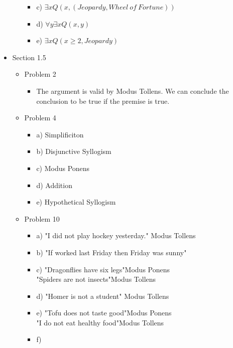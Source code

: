 \documentclass[10pt,a4paper]{article}
\begin{document}
\begin{itemize}
\begin{itemize}
\begin{itemize}
          \item c)
            $\exists xQ(x,(Jeopardy,Wheel\:of\:Fortune))$
          \item d)
            $\forall y\exists xQ(x,y)$
          \item e)
            $\exists xQ(x\ge 2, Jeopardy)$
        \end{itemize}
    \end{itemize}
  \item Section 1.5
    \begin{itemize}
      \item Problem 2
        \begin{itemize}
          \item
          The argument is valid by Modus Tollens. We can conclude the conclusion to be true if the premise is true.
        \end{itemize}
      \item Problem 4
        \begin{itemize} 
          \item a)
            Simplificiton
          \item b)
            Disjunctive Syllogism
          \item c)
            Modus Ponens
          \item d)
            Addition
          \item e)
            Hypothetical Syllogism
        \end{itemize} 
      \item Problem 10
      \begin{itemize}
        \item a)
          "I did not play hockey yesterday." \hfill Modus Tollens
        \item b)
          "If worked last Friday then Friday was sunny"
        \item c)
          "Dragonflies have six legs"\hfill Modus Ponens\\
          "Spiders are not insects"\hfill Modus Tollens
        \item d)
          "Homer is not a student" \hfill Modus Tollens
        \item e)
          "Tofu does not taste good"\hfill Modus Ponens\\
          "I do not eat healthy food"\hfill Modus Tollens
        \item f)
      \end{itemize}
    \end{itemize}

\end{itemize}
\end{document}
